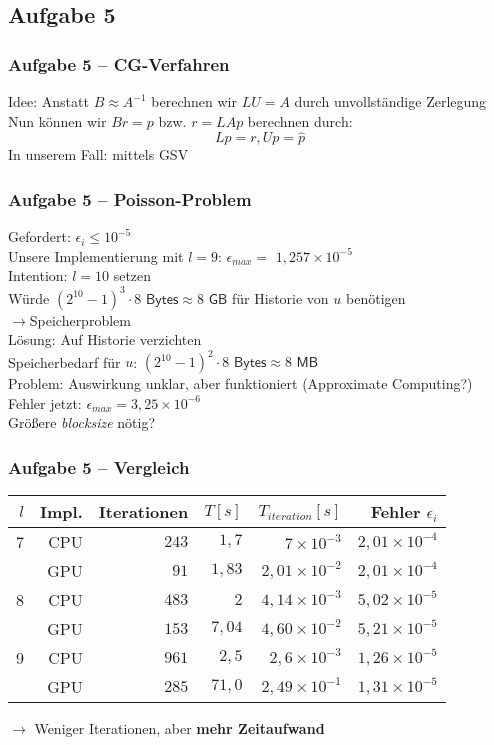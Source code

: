 \documentclass[german,notes,18pt]{beamer}
\begin{document}
	\subsection{Aufgabe 5}
	\begin{frame}
		\frametitle{Aufgabe 5 -- CG-Verfahren}
		Idee: Anstatt $B\approx A^{-1}$ berechnen wir $LU=A$ durch unvollständige Zerlegung \\
		Nun können wir $Br=p$ bzw. $r=LAp$ berechnen durch:
		\begin{equation*}
			L\hat{p}=r, Up=\hat{p}
		\end{equation*}
		In unserem Fall: mittels GSV
	\end{frame}
	\begin{frame}
		\frametitle{Aufgabe 5 -- Poisson-Problem}
		Gefordert: $\epsilon_i\leq10^{-5}$ \\
		Unsere Implementierung mit $l=9$: $\epsilon_{max}=$ {\color{lightred}$1,257\times10^{-5}$} \\
		\vspace{2em}
		\pause
		Intention: $l=10$ setzen \\
		Würde $(2^{10}-1)^3\cdot8\textsf{ Bytes}\approx${\color{lightred}$8\textsf{ GB}$} für Historie von $u$ benötigen \\
		$\rightarrow$Speicherproblem \\
		\vspace{2em}
		\pause
		Lösung: Auf Historie verzichten \\
		Speicherbedarf für $u$: $(2^{10}-1)^2\cdot8\textsf{ Bytes}\approx${\color{lightgreen}$8\textsf{ MB}$} \\
		Problem: Auswirkung unklar, aber funktioniert (Approximate Computing?) \\
		Fehler jetzt: $\epsilon_{max}=${\color{lightgreen}$3,25\times10^{-6}$} \\
		Größere \emph{blocksize} nötig?
	\end{frame}
	\begin{frame}
		\frametitle{Aufgabe 5 -- Vergleich}
		\begin{center}
			\begin{tabular}{r|r|r|r|r|r}
				$l$ & Impl. & Iterationen & $T[s]$ & $T_{iteration}[s]$ & Fehler $\epsilon_i$ \\
				\hline
				7 & CPU & $243$ & $1,7$ & $7\times10^{-3}$ & $2,01\times10^{-4}$ \\
				& GPU & $91$ & $1,83$ & $2,01\times10^{-2}$ & $2,01\times10^{-4}$ \\
				\hline
				8 & CPU & $483$ & $2$ & $4,14\times10^{-3}$ & $5,02\times10^{-5}$ \\
				& GPU & $153$ & $7,04$ & $4,60\times10^{-2}$ & $5,21\times10^{-5}$ \\
				\hline
				9 & CPU & $961$ & $2,5$ & $2,6\times10^{-3}$ & $1,26\times10^{-5}$ \\
				& GPU & $285$ & $71,0$ & $2,49\times10^{-1}$ & $1,31\times10^{-5}$ \\
			\end{tabular}
		\end{center}
		$\rightarrow$ Weniger Iterationen, aber \textbf{mehr Zeitaufwand}
	\end{frame}
\end{document}
